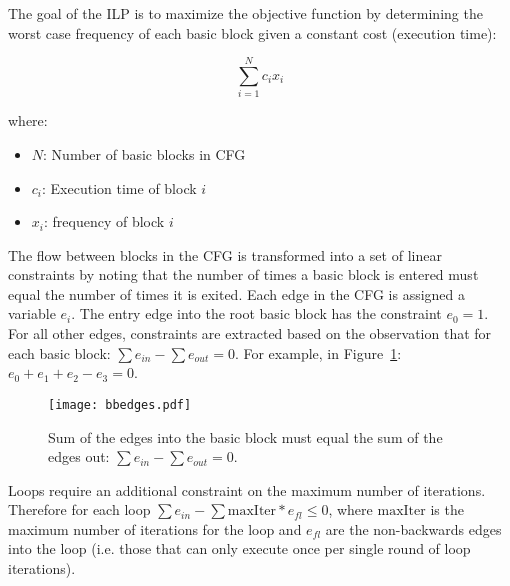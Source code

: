 	The goal of the ILP is to maximize the objective function by determining the worst case frequency of each basic block given a constant cost (execution time):

\begin{equation}
\sum_{i=1}^{N}c_ix_i 
\end{equation}

where:

\begin{itemize}
  \item $N$: Number of basic blocks in CFG
  \item $c_i$: Execution time of block $i$
  \item $x_i$: frequency of block $i$
\end{itemize}

	The flow between blocks in the CFG is transformed into a set of linear constraints by noting that the number of times a basic block is entered must equal the number of times it is exited. Each edge in the CFG is assigned a variable $e_i$. 
	The entry edge into the root basic block has the constraint $e_0 = 1$. 
	For all other edges, constraints are extracted based on the observation that for each basic block: $\sum e_{in} - \sum e_{out} = 0$. 
	For example, in Figure~\ref{f:bbedges}: $e_0+e_1+e_2-e_3=0$.

\begin{figure}[h]
\centering
\texttt{[image: bbedges.pdf]}
\caption{Sum of the edges into the basic block must equal the sum of the edges out: $\sum e_{in} - \sum e_{out} = 0$.} 
\label{f:bbedges}
\end{figure}




Loops require an additional constraint on the maximum number of iterations. Therefore for each loop $\sum e_{in} - \sum \mathrm{maxIter}*e_{fl} \le 0$, where $\mathrm{maxIter}$ is the maximum number of iterations for the loop and $e_{fl}$ are the non-backwards edges into the loop (i.e. those that can only execute once per single round of loop iterations).


